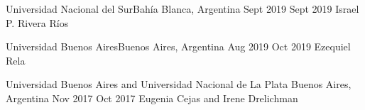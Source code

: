 \nopagebreak
    
    \begin{stay}
        {Universidad Nacional del Sur}{Bah\'ia Blanca, Argentina}
        {Sept 2019}
        {Sept 2019}
        {Israel P. Rivera R\'ios}    
    \end{stay}
   
    \begin{stay}
        {Universidad Buenos Aires}{Buenos Aires, Argentina}
        {Aug 2019}
        {Oct 2019}
        {Ezequiel Rela}    
    \end{stay}
   
    \begin{stay}
        {Universidad Buenos Aires and Universidad Nacional de La Plata}
        {Buenos Aires, Argentina}
        {Nov 2017}
        { Oct 2017}
        {Eugenia Cejas and Irene Drelichman}    
    \end{stay}